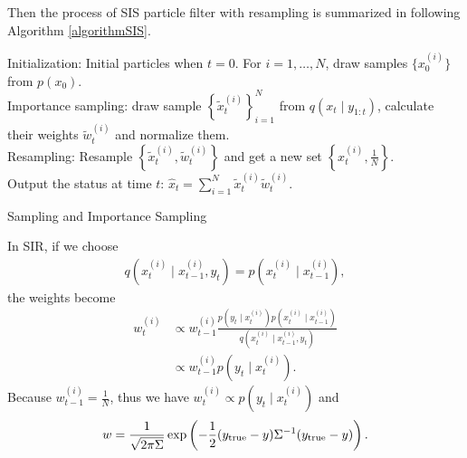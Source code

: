Then the process of SIS particle filter with resampling is summarized in following Algorithm \ref{algorithmSIS}. 
\begin{algorithm}[h]
\SetAlgoLined 
Initialization: Initial particles when $t=0$. For $i=1, \ldots, N$, draw samples $\lbrace x_0^{(i)}\rbrace$ from $p(x_0)$.\\
 {Importance sampling: draw sample $\left\lbrace \tilde{x}_t^{(i)}\right\rbrace_{i=1}^N$ from $q(x_t \mid y_{1:t})$, calculate their weights $\tilde{w}_t^{(i)}$ and normalize them. \\
Resampling: Resample $\left\lbrace \tilde{x}_t^{(i)}, \tilde{w}_t^{(i)}\right\rbrace$ and get a new set $\left\lbrace x_t^{(i)},\frac{1}{N}\right\rbrace$.\\
Output the status at time $t$: $\hat{x}_t =\sum_{i=1}^{N}\tilde{x}_t^{(i)}\tilde{w}_t^{(i)}$.}
 \caption{Sampling and Importance Sampling}\label{algorithmSIS}
\end{algorithm}


In SIR, if we choose
\begin{align*}
q\left(x_t^{(i)}\mid x_{t-1}^{(i)},y_t\right) = p\left(x_t^{(i)}\mid x_{t-1}^{(i)}\right),
\end{align*}
the weights become
\begin{align*}
w_t^{(i)}&\propto w_{t-1}^{(i)}\frac{ p\left(y_t \mid x_{t}^{(i)}\right) p\left(x_t^{(i)}\mid x_{t-1}^{(i)}\right)}{q\left(x_t^{(i)}\mid x_{t-1}^{(i)},y_t \right)}\\
&\propto w_{t-1}^{(i)}p\left(y_t \mid x_{t}^{(i)}\right).
\end{align*}
Because $w_{t-1}^{(i)}=\frac{1}{N}$, thus we have $w_t^{(i)} \propto p\left(y_t \mid x_{t}^{(i)}\right)$ and
\begin{align*}
w=\frac{1}{\sqrt{2\pi\Sigma}}\exp\left(-\frac{1}{2} (y_{\mbox{\scriptsize true}}-y)\Sigma^{-1}(y_{\mbox{\scriptsize true}}-y)\right).
\end{align*}

